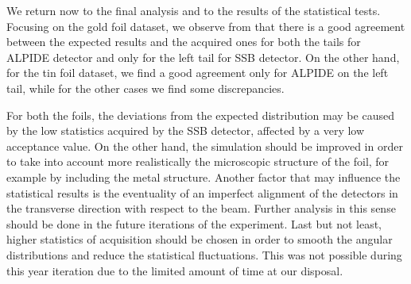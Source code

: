 \documentclass[../../main/main.tex]{subfiles}
\begin{document}
We return now to the final analysis and to the results of the statistical tests. Focusing on the gold foil dataset, we observe from  that there is a good agreement between the expected results and the acquired ones for both the tails for ALPIDE detector and only for the left tail for SSB detector. On the other hand, for the tin foil dataset, we find a good agreement only for ALPIDE on the left tail, while for the other cases we find some discrepancies.

For both the foils, the deviations from the expected distribution may be caused by the low statistics acquired by the SSB detector, affected by a very low acceptance value. On the other hand, the simulation should be improved in order to take into account more realistically the microscopic structure of the foil, for example by including the metal structure. Another factor that may influence the statistical results is the eventuality of an imperfect alignment of the detectors in the transverse direction with respect to the beam. Further analysis in this sense should be done in the future iterations of the experiment. Last but not least, higher statistics of acquisition should be chosen in order to smooth the angular distributions and reduce the statistical fluctuations. This was not possible during this year iteration due to the limited amount of time at our disposal.




\end{document}
